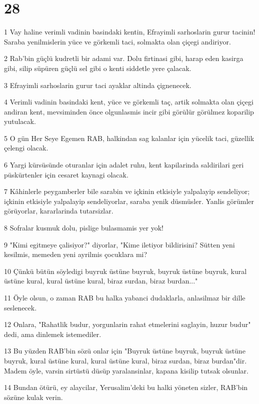 \chapter{28}

\par 1 Vay haline verimli vadinin basindaki kentin, Efrayimli sarhoslarin gurur tacinin! Saraba yenilmislerin yüce ve görkemli taci, solmakta olan çiçegi andiriyor.
\par 2 Rab'bin güçlü kudretli bir adami var. Dolu firtinasi gibi, harap eden kasirga gibi, silip süpüren güçlü sel gibi o kenti siddetle yere çalacak.
\par 3 Efrayimli sarhoslarin gurur taci ayaklar altinda çignenecek.
\par 4 Verimli vadinin basindaki kent, yüce ve görkemli taç, artik solmakta olan çiçegi andiran kent, mevsiminden önce olgunlasmis incir gibi görülür görülmez koparilip yutulacak.
\par 5 O gün Her Seye Egemen RAB, halkindan sag kalanlar için yücelik taci, güzellik çelengi olacak.
\par 6 Yargi kürsüsünde oturanlar için adalet ruhu, kent kapilarinda saldirilari geri püskürtenler için cesaret kaynagi olacak.
\par 7 Kâhinlerle peygamberler bile sarabin ve içkinin etkisiyle yalpalayip sendeliyor; içkinin etkisiyle yalpalayip sendeliyorlar, saraba yenik düsmüsler. Yanlis görümler görüyorlar, kararlarinda tutarsizlar.
\par 8 Sofralar kusmuk dolu, pislige bulasmamis yer yok!
\par 9 "Kimi egitmeye çalisiyor?" diyorlar, "Kime iletiyor bildirisini? Sütten yeni kesilmis, memeden yeni ayrilmis çocuklara mi?
\par 10 Çünkü bütün söyledigi buyruk üstüne buyruk, buyruk üstüne buyruk, kural üstüne kural, kural üstüne kural, biraz surdan, biraz burdan..."
\par 11 Öyle olsun, o zaman RAB bu halka yabanci dudaklarla, anlasilmaz bir dille seslenecek.
\par 12 Onlara, "Rahatlik budur, yorgunlarin rahat etmelerini saglayin, huzur budur" dedi, ama dinlemek istemediler.
\par 13 Bu yüzden RAB'bin sözü onlar için "Buyruk üstüne buyruk, buyruk üstüne buyruk, kural üstüne kural, kural üstüne kural, biraz surdan, biraz burdan"dir. Madem öyle, varsin sirtüstü düsüp yaralansinlar, kapana kisilip tutsak olsunlar.
\par 14 Bundan ötürü, ey alaycilar, Yerusalim'deki bu halki yöneten sizler, RAB'bin sözüne kulak verin.
